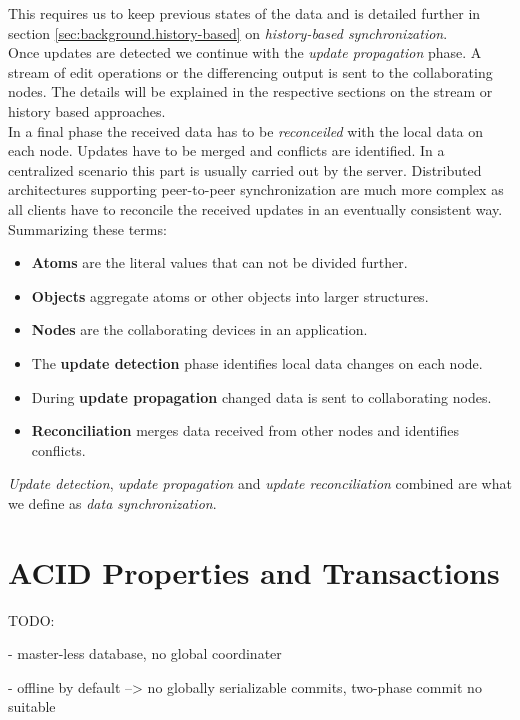 This requires us to keep previous states of the data and is detailed further in section \ref{sec:background.history-based} on \emph{history-based synchronization}.\\
Once updates are detected we continue with the \emph{update propagation} phase.
A stream of edit operations or the differencing output is sent to the collaborating nodes.
The details will be explained in the respective sections on the stream or history based approaches.\\
In a final phase the received data has to be \emph{reconceiled} with the local data on each node.
Updates have to be merged and conflicts are identified.
In a centralized scenario this part is usually carried out by the server.
Distributed architectures supporting peer-to-peer synchronization are much more complex as all clients have to reconcile the received updates in an eventually consistent way.\\

Summarizing these terms:

\begin{itemize}
\item \textbf{Atoms} are the literal values that can not be divided further.
\item \textbf{Objects} aggregate atoms or other objects into larger structures.
\item \textbf{Nodes} are the collaborating devices in an application.
\item The \textbf{update detection} phase identifies local data changes on each node.
\item During \textbf{update propagation} changed data is sent to collaborating nodes.
\item \textbf{Reconciliation} merges data received from other nodes and identifies conflicts.
\end{itemize}

\emph{Update detection}, \emph{update propagation} and \emph{update reconciliation} combined are what we define as \emph{data synchronization}.

\section{ACID Properties and Transactions}

TODO:

- master-less database, no global coordinater

- offline by default --> no globally serializable commits, two-phase commit no suitable

